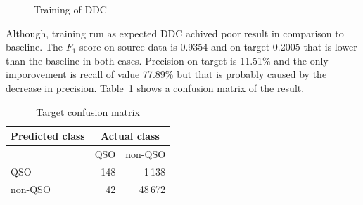 \begin{figure}
\caption{Training of DDC}
\label{ddc_training}
\end{figure}

Although, training run as expected
DDC achived poor result in comparison to baseline.
The \(F_1\) score on source data is 0.9354 and on target 0.2005
that is lower than the baseline in both cases.
Precision on target is 11.51\% and
the only imporovement is recall of value 77.89\%
but that is probably caused by the decrease in precision.
Table~\ref{ddc_confusion} shows a confusion matrix of the result.

\begin{table}
\begin{center}
\begin{tabular}{|l|r|r|}
	\hline
	Predicted class & \multicolumn{2}{c|}{Actual class} \\
	\hline \hline
	& QSO & non-QSO \\ \hline
	QSO & 148 & 1\,138 \\ \hline
	non-QSO & 42 & 48\,672 \\ \hline
\end{tabular}
\end{center}
\caption{Target confusion matrix}
\label{ddc_confusion}
\end{table}

